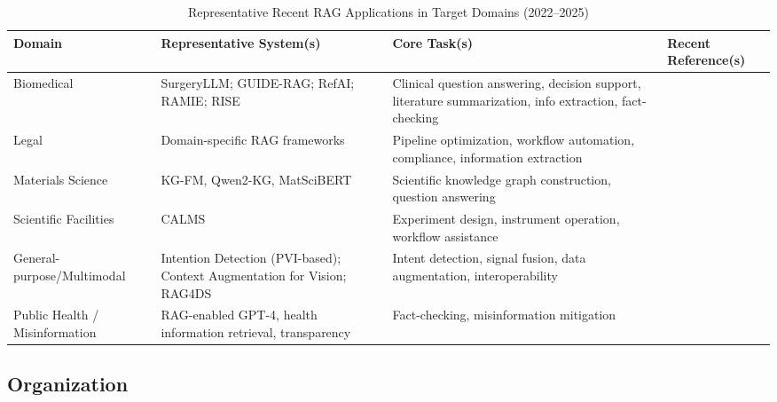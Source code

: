 \documentclass[sigconf]{acmart}
\begin{document}
\begin{table*}[htbp]
\centering
\caption{Representative Recent RAG Applications in Target Domains (2022–2025)}
\label{tab:domain_rag_examples}
\begin{adjustbox}{max width=\textwidth}
\begin{tabular}{@{}llll@{}}
\toprule
Domain & Representative System(s) & Core Task(s) & Recent Reference(s) \\
\midrule
Biomedical & SurgeryLLM; GUIDE-RAG; RefAI; RAMIE; RISE & Clinical question answering, decision support, literature summarization, info extraction, fact-checking & \cite{ref1,ref2,ref5,ref6,ref7,ref48,ref52,ref53,ref54,ref55} \\
Legal & Domain-specific RAG frameworks & Pipeline optimization, workflow automation, compliance, information extraction & \cite{ref63} \\
Materials Science & KG-FM, Qwen2-KG, MatSciBERT & Scientific knowledge graph construction, question answering & \cite{ref29,ref31} \\
Scientific Facilities & CALMS & Experiment design, instrument operation, workflow assistance & \cite{ref30} \\
General-purpose/Multimodal & Intention Detection (PVI-based); Context Augmentation for Vision; RAG4DS & Intent detection, signal fusion, data augmentation, interoperability & \cite{ref61,ref62,ref64} \\
Public Health / Misinformation & RAG-enabled GPT-4, health information retrieval, transparency & Fact-checking, misinformation mitigation & \cite{ref42,ref54} \\
\bottomrule
\end{tabular}
\end{adjustbox}
\end{table*}

\subsection{Organization}
\end{document}
